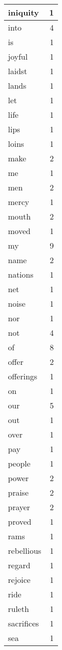 \begin{center}
\begin{longtable}{l|r}
iniquity & 1 \\ \hline
into & 4 \\ \hline
is & 1 \\ \hline
joyful & 1 \\ \hline
laidst & 1 \\ \hline
lands & 1 \\ \hline
let & 1 \\ \hline
life & 1 \\ \hline
lips & 1 \\ \hline
loins & 1 \\ \hline
make & 2 \\ \hline
me & 1 \\ \hline
men & 2 \\ \hline
mercy & 1 \\ \hline
mouth & 2 \\ \hline
moved & 1 \\ \hline
my & 9 \\ \hline
name & 2 \\ \hline
nations & 1 \\ \hline
net & 1 \\ \hline
noise & 1 \\ \hline
nor & 1 \\ \hline
not & 4 \\ \hline
of & 8 \\ \hline
offer & 2 \\ \hline
offerings & 1 \\ \hline
on & 1 \\ \hline
our & 5 \\ \hline
out & 1 \\ \hline
over & 1 \\ \hline
pay & 1 \\ \hline
people & 1 \\ \hline
power & 2 \\ \hline
praise & 2 \\ \hline
prayer & 2 \\ \hline
proved & 1 \\ \hline
rams & 1 \\ \hline
rebellious & 1 \\ \hline
regard & 1 \\ \hline
rejoice & 1 \\ \hline
ride & 1 \\ \hline
ruleth & 1 \\ \hline
sacrifices & 1 \\ \hline
sea & 1 \\ \hline

\end{longtable}
\end{center}
